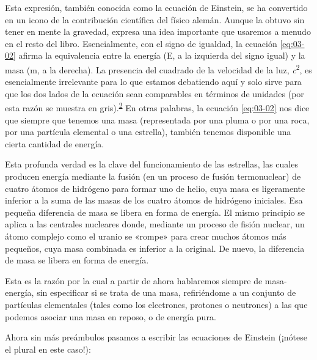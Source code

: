 Esta expresión, también conocida como la ecuación de Einstein, se ha convertido en un icono de
la contribución científica del físico alemán. Aunque la obtuvo sin tener en mente la gravedad,
expresa una idea importante que usaremos a menudo en el resto del libro. Esencialmente, con el
signo de igualdad, la ecuación \eqref{eq:03-02} afirma la equivalencia entre la energía (E, a
la izquierda del signo igual) y la masa (m, a la derecha). La presencia del cuadrado de la
velocidad de la luz, \emph{c}\textsuperscript{2}, es esencialmente irrelevante para lo que
estamos debatiendo aquí y solo sirve para que los dos lados de la ecuación sean comparables en
términos de unidades (por esta razón se muestra en
gris).\textsuperscript{\hyperlink{note:03-02}{2}} En otras palabras, la ecuación
\eqref{eq:03-02} nos dice que siempre que tenemos una masa (representada por una pluma o por
una roca, por una partícula elemental o una estrella), también tenemos disponible una cierta
cantidad de energía.

Esta profunda verdad es la clave del funcionamiento de las estrellas, las cuales producen
energía mediante la fusión (en un proceso de fusión termonuclear) de cuatro átomos de hidrógeno
para formar uno de helio, cuya masa es ligeramente inferior a la suma de las masas de los
cuatro átomos de hidrógeno iniciales. Esa pequeña diferencia de masa se libera en forma de
energía. El mismo principio se aplica a las centrales nucleares donde, mediante un proceso de
fisión nuclear, un átomo complejo como el uranio se «rompe» para crear muchos átomos más
pequeños, cuya masa combinada es inferior a la original. De nuevo, la diferencia de masa se
libera en forma de energía.

Esta es la razón por la cual a partir de ahora hablaremos siempre de masa-energía, sin
especificar si se trata de una masa, refiriéndome a un conjunto de partículas elementales
(tales como los electrones, protones o neutrones) a las que podemos asociar una masa en reposo,
o de energía pura.

Ahora sin más preámbulos pasamos a escribir las ecuaciones de Einstein (¡nótese el plural en
este caso!):

